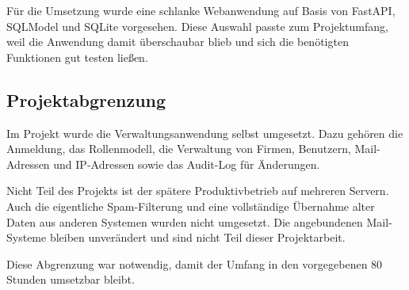 Für die Umsetzung wurde eine schlanke Webanwendung auf Basis von FastAPI,
SQLModel und SQLite vorgesehen. Diese Auswahl passte zum Projektumfang, weil
die Anwendung damit überschaubar blieb und sich die benötigten Funktionen gut
testen ließen.

\subsection{Projektabgrenzung}
\label{sec:Projektabgrenzung}
Im Projekt wurde die Verwaltungsanwendung selbst umgesetzt. Dazu gehören die
Anmeldung, das Rollenmodell, die Verwaltung von Firmen, Benutzern,
Mail-Adressen und IP-Adressen sowie das Audit-Log für Änderungen.

Nicht Teil des Projekts ist der spätere Produktivbetrieb auf mehreren Servern.
Auch die eigentliche Spam-Filterung und eine vollständige Übernahme alter Daten
aus anderen Systemen wurden nicht umgesetzt. Die angebundenen Mail-Systeme
bleiben unverändert und sind nicht Teil dieser Projektarbeit.

Diese Abgrenzung war notwendig, damit der Umfang in den vorgegebenen 80 Stunden
umsetzbar bleibt.
